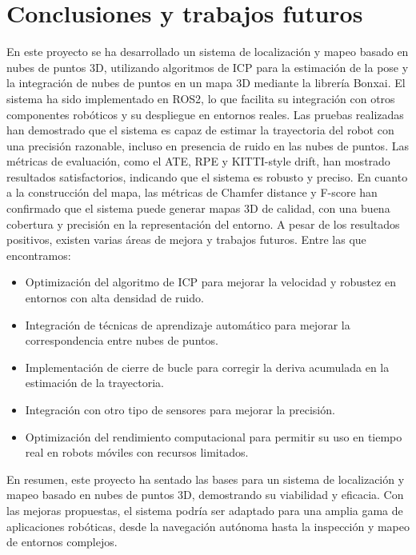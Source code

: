 \documentclass[12pt, a4paper, twoside]{article}
\begin{document}
\section{Conclusiones y trabajos futuros}
En este proyecto se ha desarrollado un sistema de localización y mapeo basado en nubes de puntos 3D, utilizando algoritmos de ICP para la estimación de la pose y la integración de nubes de puntos en un mapa 
3D mediante la librería Bonxai. El sistema ha sido implementado en ROS2\cite{doi:10.1126/scirobotics.abm6074}, lo que facilita su integración con otros componentes robóticos y su despliegue en entornos reales.\newline
Las pruebas realizadas han demostrado que el sistema es capaz de estimar la trayectoria del robot con una precisión razonable, incluso en presencia de ruido en las nubes de puntos. Las métricas de
evaluación, como el ATE\cite{Chen2022DELOATE}, RPE\cite{Sturm2012RPE} y KITTI-style drift\cite{Geiger2013KITTI}, han mostrado resultados satisfactorios, indicando que el sistema es robusto y preciso.\newline
En cuanto a la construcción del mapa, las métricas de Chamfer\cite{Fan2020Chamfer} distance y F-score\cite{Caccia2018FScore} han confirmado que el sistema puede generar mapas 3D de calidad, con una buena cobertura y precisión en la 
representación del entorno.\newline
A pesar de los resultados positivos, existen varias áreas de mejora y trabajos futuros.  Entre las que encontramos: 
\begin{itemize}
  \item Optimización del algoritmo de ICP para mejorar la velocidad y robustez en entornos con alta densidad de ruido.
  \item Integración de técnicas de aprendizaje automático para mejorar la correspondencia entre nubes de puntos.
  \item Implementación de cierre de bucle para corregir la deriva acumulada en la estimación de la trayectoria.
  \item Integración con otro tipo de sensores para mejorar la precisión.
  \item Optimización del rendimiento computacional para permitir su uso en tiempo real en robots móviles con recursos limitados.
\end{itemize}
En resumen, este proyecto ha sentado las bases para un sistema de localización y mapeo basado en nubes de puntos 3D, demostrando su viabilidad y eficacia. Con las mejoras propuestas, el sistema podría
ser adaptado para una amplia gama de aplicaciones robóticas, desde la navegación autónoma hasta la inspección y mapeo de entornos complejos.
\end{document}
